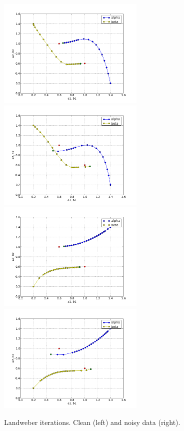 \begin{figure}
\begin{center}
    \includegraphics[width=7cm]{chapters/schroll/pdf/4Dscan3b.pdf}
    \includegraphics[width=7cm]{chapters/schroll/pdf/4Dscan3b-5.pdf}
    \includegraphics[width=7cm]{chapters/schroll/pdf/4Dscan4b.pdf}
    \includegraphics[width=7cm]{chapters/schroll/pdf/4Dscan4b-5.pdf}
    \vspace{-0.7cm}
    \label{fig4}
    \caption{Landweber iterations. Clean (left) and noisy data (right).}
  \end{center}
\end{figure}

